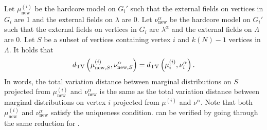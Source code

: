Let $\mu^{(i)}_{\text{new}}$ be the hardcore model on $G_i'$ such that the external fields on vertices in $G_i$ are 1 and the external fields on $\lambda$ are 0. Let $\nu^\alpha_{\text{new}}$ be the hardcore model on $G_i'$ such that the external fields on vertices in $G_i$ are $\lambda^\alpha$ and the external fields on $\Lambda$ are 0. Let $S$ be a subset of vertices containing vertex $i$ and $k(N) - 1$ vertices in $\Lambda$. It holds that 
\begin{align*}
 d_{\mathrm{TV}}\left({\mu_{\text{new},S}^{(i)}},{\nu_{\text{new},S}^\alpha}\right) = d_{\mathrm{TV}}\left({\mu^{(i)}_i},{\nu^\alpha_i}\right).   
\end{align*}
In words, the total variation distance between marginal distributions on $S$ projected from $\mu^{(i)}_{\text{new}}$ and $\nu^\alpha_{\text{new}}$ is the same as the total variation distance between marginal distributions on vertex $i$ projected from $\mu^{(i)}$ and $\nu^\alpha$. Note that both $\mu^{(i)}_{\text{new}}$ and $\nu^\alpha_{\text{new}}$ satisfy the uniqueness condition.  can be verified by going through the same reduction for .


